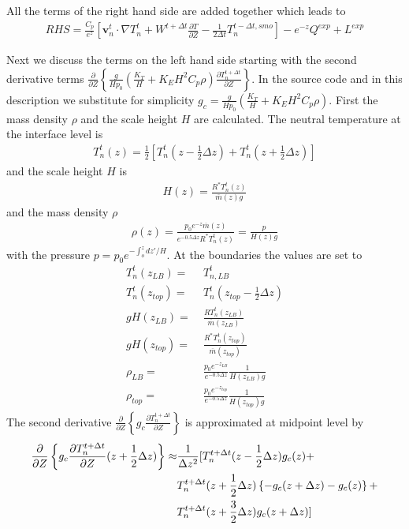 All the terms of the right hand side are added together which leads
to
%
\begin{align}
 RHS = \frac{C_p}{e^z} \left[ \mathbf{v}_n^t \cdot \nabla T_n^t + W^{t+\Delta t}
      \frac{\partial T}{\partial Z} - \frac{1}{2 \Delta t} T_n^{t-\Delta t,smo}
      \right] - e^{-z} Q^{exp} + L^{exp}
\end{align}
%

Next we discuss the terms on the left hand side starting with the
second derivative terms  $\frac{\partial}{\partial Z} \left\{
  \frac{g}{H p_0} \left( \frac{K_T}{H} + K_E H^2 C_p \rho \right)
  \frac{\partial T_n^{t+\Delta t}}{\partial Z}
  \right\}$. In the source code and in this description we
  substitute for simplicity $g_c = \frac{g}{H p_0} \left( \frac{K_T}{H} +
  K_E H^2 C_p \rho \right)$. First the mass density $\rho$ and the
  scale height $H$ are calculated.
The neutral temperature at the interface level is
%
\begin{align}
  T_n^t(z) = \frac{1}{2}\left[ T_n^t(z - \frac{1}{2}\Delta z) +  T_n^t(z + \frac{1}{2}\Delta z)\right]
\end{align}
%
and the scale height $H$ is
%
\begin{align}
  H(z)= \frac{R^* T_n^t(z)}{\overline{m}(z) g}
\end{align}
%
and the mass density $\rho$
%
\begin{align}
  \rho(z)= \frac{p_0 e^{-z} \overline{m}(z)}{e^{-0.5 \Delta z} R^*
  T_n^t(z)} =\frac{p}{H(z) g}
\end{align}
%
with the pressure $p = p_0 e^{-\int_o^z dz'/H}$. At the boundaries
the values are set to
%
\begin{align}
  T_n^{t}(z_{LB}) = & \; T_{n,LB}^{t} \\
  T_n^{t}(z_{top}) = & \; T_{n}^{t}(z_{top}-\frac{1}{2}\Delta z) \\
  g H(z_{LB}) = & \; \frac{R T_n^{t}(z_{LB})}{\overline{m}(z_{LB})} \\
  g H(z_{top}) = & \; \frac{R^* T_n^{t}(z_{top})}{\overline{m}(z_{top})} \\
  \rho_{LB} = &  \; \frac{p_0 e^{-z_{LB}} }{e^{-0.5 \Delta z}} \frac{1}{H(z_{LB})
  g} \\
  \rho_{top} = &  \; \frac{p_0 e^{-z_{top}} }{e^{-0.5 \Delta z}} \frac{1}{H(z_{top})
  g}
\end{align}
%
The second derivative $\frac{\partial}{\partial Z}\left\{ g_c
\frac{\partial T_n^{t+\Delta t}}{\partial Z}\right\}$ is
approximated at midpoint level by
%
\begin{align}
  \frac{\partial}{\partial Z} \left\{ g_c \frac{\partial T_n^{t+\Delta t}}
     {\partial Z}(z+\frac{1}{2}\Delta z)\right\} \approx &
    \frac{1}{\Delta z^2} [
     T_n^{t+\Delta t}(z-\frac{1}{2}\Delta z) g_c(z) + \notag \\
   {} & T_n^{t+\Delta
     t}(z+\frac{1}{2}\Delta z)\left\{ -g_c(z+\Delta z)- g_c(z)\right\}
     + \notag \\
  {} & T_n^{t+\Delta t}(z+\frac{3}{2}\Delta z)g_c(z+\Delta z)
     ]
\end{align}
